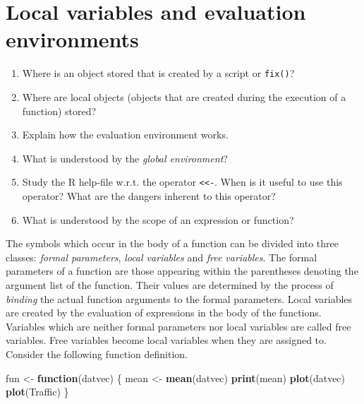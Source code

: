 \documentclass[
]{book}
\newenvironment{Shaded}{\begin{snugshade}}{\end{snugshade}}
\newcommand{\ControlFlowTok}[1]{\textcolor[rgb]{0.13,0.29,0.53}{\textbf{#1}}}
\newcommand{\FunctionTok}[1]{\textcolor[rgb]{0.13,0.29,0.53}{\textbf{#1}}}
\newcommand{\NormalTok}[1]{#1}
\newcommand{\OtherTok}[1]{\textcolor[rgb]{0.56,0.35,0.01}{#1}}
\begin{document}
\section{Local variables and evaluation environments}\label{local-variables-and-evaluation-environments}

\begin{enumerate}
\def\labelenumi{(\alph{enumi})}
\item
  Where is an object stored that is created by a script or \texttt{fix()}?
\item
  Where are local objects (objects that are created during the execution of a function) stored?
\item
  Explain how the evaluation environment works.
\item
  What is understood by the \emph{{global environment}}?
\item
  Study the R help-file w.r.t. the operator \texttt{\textless{}\textless{}-}. When is it useful to use this operator? What are the dangers inherent to this operator?
\item
  What is understood by the scope of an expression or function?
\end{enumerate}

The symbols which occur in the body of a function can be divided into three classes: \emph{{formal parameters}}, \emph{{local variables}} and \emph{{free variables}}. The formal parameters of a function are those appearing within the parentheses denoting the argument list of the function. Their values are determined by the process of \emph{{binding}} the actual function arguments to the formal parameters. Local variables are created by the evaluation of expressions in the body of the functions. Variables which are neither formal parameters nor local variables are called free variables. Free variables become local variables when they are assigned to. Consider the following function definition.

\begin{Shaded}
\begin{Highlighting}[]
\NormalTok{fun }\OtherTok{\textless{}{-}} \ControlFlowTok{function}\NormalTok{(datvec) \{}
\NormalTok{          mean }\OtherTok{\textless{}{-}} \FunctionTok{mean}\NormalTok{(datvec)}
          \FunctionTok{print}\NormalTok{(mean)}
          \FunctionTok{plot}\NormalTok{(datvec)}
          \FunctionTok{plot}\NormalTok{(Traffic)}
\NormalTok{       \}}
\end{Highlighting}
\end{Shaded}
\end{document}
